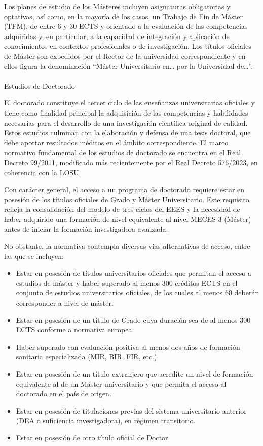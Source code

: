 \documentclass[
  11pt,
  a4paper,
  twoside]{scrreprt}
\makeatletter
\let\oldparagraph\paragraph
\renewcommand{\paragraph}{
    \@ifstar
      \xxxParagraphStar
      \xxxParagraphNoStar
  }
\newcommand{\xxxParagraphStar}[1]{\oldparagraph*{#1}\mbox{}}
\newcommand{\xxxParagraphNoStar}[1]{\oldparagraph{#1}\mbox{}}
\providecommand{\tightlist}{%
  \setlength{\itemsep}{0pt}\setlength{\parskip}{0pt}}
\makeatother
\begin{document}
Los planes de estudio de los Másteres incluyen asignaturas obligatorias
y optativas, así como, en la mayoría de los casos, un Trabajo de Fin de
Máster (TFM), de entre 6 y 30 ECTS y orientado a la evaluación de las
competencias adquiridas y, en particular, a la capacidad de integración
y aplicación de conocimientos en contextos profesionales o de
investigación. Los títulos oficiales de Máster son expedidos por el
Rector de la universidad correspondiente y en ellos figura la
denominación ``Máster Universitario en\ldots{} por la Universidad
de\ldots''.

\paragraph{Estudios de Doctorado}\label{estudios-de-doctorado}

El doctorado constituye el tercer ciclo de las enseñanzas universitarias
oficiales y tiene como finalidad principal la adquisición de las
competencias y habilidades necesarias para el desarrollo de una
investigación científica original de calidad. Estos estudios culminan
con la elaboración y defensa de una tesis doctoral, que debe aportar
resultados inéditos en el ámbito correspondiente. El marco normativo
fundamental de los estudios de doctorado se encuentra en el Real Decreto
99/2011, modificado más recientemente por el Real Decreto 576/2023, en
coherencia con la LOSU.

Con carácter general, el acceso a un programa de doctorado requiere
estar en posesión de los títulos oficiales de Grado y Máster
Universitario. Este requisito refleja la consolidación del modelo de
tres ciclos del EEES y la necesidad de haber adquirido una formación de
nivel equivalente al nivel MECES 3 (Máster) antes de iniciar la
formación investigadora avanzada.

No obstante, la normativa contempla diversas vías alternativas de
acceso, entre las que se incluyen:

\begin{itemize}
\tightlist
\item
  Estar en posesión de títulos universitarios oficiales que permitan el
  acceso a estudios de máster y haber superado al menos 300 créditos
  ECTS en el conjunto de estudios universitarios oficiales, de los
  cuales al menos 60 deberán corresponder a nivel de máster.
\item
  Estar en posesión de un título de Grado cuya duración sea de al menos
  300 ECTS conforme a normativa europea.
\item
  Haber superado con evaluación positiva al menos dos años de formación
  sanitaria especializada (MIR, BIR, FIR, etc.).
\item
  Estar en posesión de un título extranjero que acredite un nivel de
  formación equivalente al de un Máster universitario y que permita el
  acceso al doctorado en el país de origen.
\item
  Estar en posesión de titulaciones previas del sistema universitario
  anterior (DEA o suficiencia investigadora), en régimen transitorio.
\item
  Estar en posesión de otro título oficial de Doctor.
\end{itemize}
\end{document}

